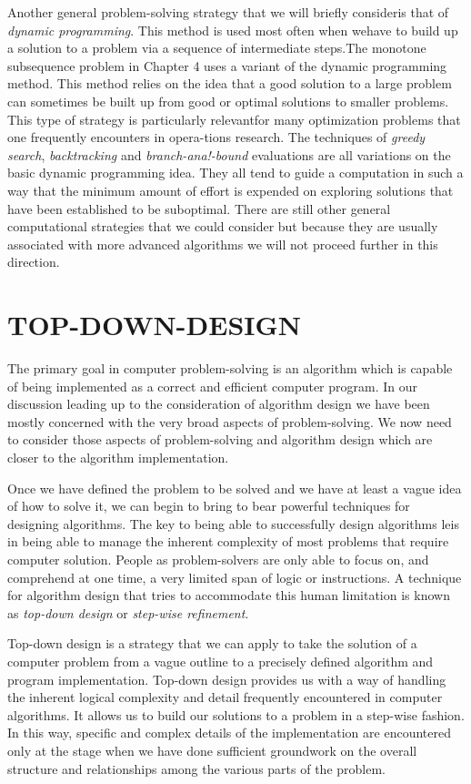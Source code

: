 \documentclass{book}
\begin{document}
	Another general problem-solving strategy that we will briefly consideris that of \textit{dynamic programming}. This method is used most often when wehave to build up a solution to a problem via a sequence of intermediate steps.The monotone subsequence problem in Chapter 4 uses a variant of the dynamic programming method. This method relies on the idea that a good solution to a large problem can sometimes be built up from good or optimal solutions to smaller problems. This type of strategy is particularly relevantfor many optimization problems that one frequently encounters in opera-tions research. The techniques of \textit{greedy search}, \textit{backtracking} and \textit{branch-ana!-bound} evaluations are all variations on the basic dynamic programming idea. They all tend to guide a computation in such a way that the minimum amount of effort is expended on exploring solutions that have been established to be suboptimal. There are still other general computational strategies that we could consider but because they are usually associated with more advanced algorithms we will not proceed further in this direction.

\section{TOP-DOWN-DESIGN}
The primary goal in computer problem-solving is an algorithm which is capable of being implemented as a correct and efficient computer program. In our discussion leading up to the consideration of algorithm design we have been mostly concerned with the very broad aspects of problem-solving. We now need to consider those aspects of problem-solving and algorithm design which are closer to the algorithm implementation.\par

	Once we have defined the problem to be solved and we have at least a vague idea of how to solve it, we can begin to bring to bear powerful techniques for designing algorithms. The key to being able to successfully design algorithms leis in being able to manage the inherent complexity of most problems that require computer solution. People as problem-solvers are only able to focus on, and comprehend at one time, a very limited span of logic or instructions. A technique for algorithm design that tries to accommodate this human limitation is known as \textit{top-down design} or \textit{step-wise refinement}.\par
	
	Top-down design is a strategy that we can apply to take the solution of a computer problem from a vague outline to a precisely defined algorithm and program implementation. Top-down design provides us with a way of handling the inherent logical complexity and detail frequently encountered in computer algorithms. It allows us to build our solutions to a problem in a step-wise fashion. In this way, specific and complex details of the implementation are encountered only at the stage when we have done sufficient groundwork on the overall structure and relationships among the various parts of the problem.
\end{document}

